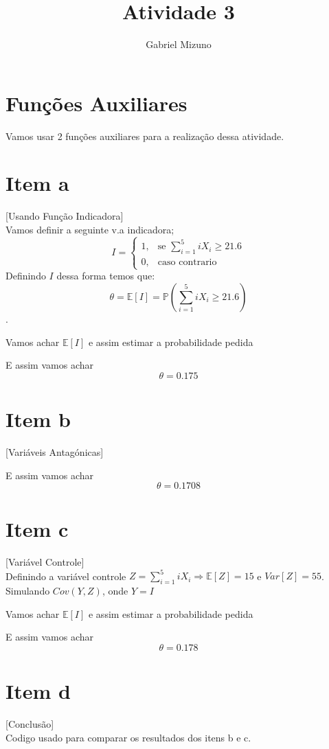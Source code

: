 \documentclass[11pt,a4paper]{article}
\title{Atividade 3}
\author{Gabriel Mizuno}
\begin{document}
\maketitle

\section*{Funções Auxiliares}
Vamos usar 2 funções auxiliares para a realização dessa atividade.


\section{Item a}[Usando Função Indicadora] \\
Vamos definir a seguinte v.a indicadora;$$I=\begin{cases} 1, & \mbox{se } \displaystyle\sum_{i=1}^5 iX_{i}\geqslant21.6\\ 0, & \mbox{caso contrario}\end{cases}$$  
Definindo $I$ dessa forma temos que:
$$\theta=\mathbb{E}[I]=\mathbb{P}\left( \displaystyle\sum_{i=1}^5 iX_{i}\geqslant21.6\right) $$.
\newpage


Vamos achar $\mathbb{E}[I]$ e assim estimar a probabilidade pedida


E assim vamos achar $$\theta=0.175 $$
\section{Item b}[Variáveis Antagónicas]

E assim vamos achar $$\theta=0.1708 $$
\newpage
\section{Item c}[Variável Controle]\\
Definindo a variável controle $Z=\displaystyle\sum_{i=1}^5 iX_{i} \Rightarrow \mathbb{E}[Z]=15$ e $Var[Z]=55$.
Simulando $Cov(Y,Z)$, onde $Y=I$



Vamos achar $\mathbb{E}[I]$ e assim estimar a probabilidade pedida


E assim vamos achar $$\theta=0.178 $$
\section{Item d}[Conclusão]\\
Codigo usado para comparar os resultados dos itens b e c.

\end{document}

